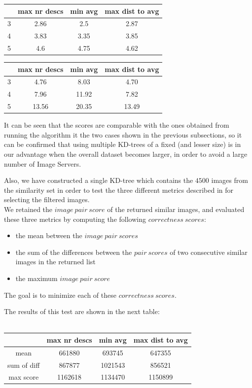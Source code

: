 \documentclass[conference]{IEEEtran}
\begin{document}
\begin{tabular} {c | c | c | c}
	& max nr descs & min avg & max dist to avg \\
	\hline
	3 & 2.86 & 2.5 & 2.87 \\
	\hline
	4 & 3.83 & 3.35 & 3.85 \\
	\hline
	5 & 4.6 & 4.75 & 4.62 \\
\end{tabular}

\begin{tabular} {c | c | c | c}
	& max nr descs & min avg & max dist to avg \\
	\hline
	3 & 4.76 & 8.03 & 4.70 \\
	\hline
	4 & 7.96 & 11.92 & 7.82 \\
	\hline
	5 & 13.56 & 20.35 & 13.49 \\
\end{tabular}

It can be seen that the scores are comparable with the ones obtained from running the algorithm it the two cases shown in the previous subsections, so it can be confirmed that using multiple KD-trees of a fixed (and lesser size) is in our advantage when the overall dataset becomes larger, in order to avoid a large number of Image Servers.

Also, we have constructed a single KD-tree which contains the $4500$ images from the similarity set in order to test the three different metrics described in  for selecting the filtered images.\\
We retained the $image\ pair\ score$ of the returned similar images, and evaluated these three metrics by computing the following $correctness\ scores$:
\begin{itemize}
	\item the mean between the $image\ pair\ scores$
	\item the sum of the differences between the $pair\ scores$ of two consecutive similar images in the returned list
	\item the maximum $image\ pair\ score$
\end{itemize}
The goal is to minimize each of these $correctness\ scores$.

The results of this test are shown in the next table:\\
\\
\begin{tabular} {c | c | c | c}
	& max nr descs & min avg & max dist to avg \\
	\hline
	mean & 661880 & 693745 & 647355 \\
	\hline
	sum of diff & 867877 & 1021543 & 856521 \\
	\hline
	max score & 1162618 & 1134470 & 1150899 \\
\end{tabular}
\end{document}
